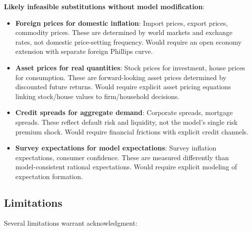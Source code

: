 \documentclass[12pt]{article}
\begin{document}
\textbf{Likely infeasible substitutions without model modification}:
\begin{itemize}
    \item \textbf{Foreign prices for domestic inflation}: Import prices, export prices, commodity prices. These are determined by world markets and exchange rates, not domestic price-setting frequency. Would require an open economy extension with separate foreign Phillips curve.
    
    \item \textbf{Asset prices for real quantities}: Stock prices for investment, house prices for consumption. These are forward-looking asset prices determined by discounted future returns. Would require explicit asset pricing equations linking stock/house values to firm/household decisions.
    
    \item \textbf{Credit spreads for aggregate demand}: Corporate spreads, mortgage spreads. These reflect default risk and liquidity, not the model's single risk premium shock. Would require financial frictions with explicit credit channels.
    
    \item \textbf{Survey expectations for model expectations}: Survey inflation expectations, consumer confidence. These are measured differently than model-consistent rational expectations. Would require explicit modeling of expectation formation.
\end{itemize}

\subsection{Limitations}

Several limitations warrant acknowledgment:
\end{document}
